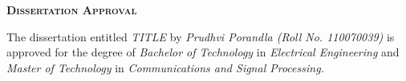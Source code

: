 
\newpage

\thispagestyle{empty}
\begin{center}
  \begin{Huge}
    \textsc{\textbf{Dissertation Approval}}
  \end{Huge}
\end{center}

\vspace{0.2in}

 The dissertation entitled \textit{TITLE} by \textit{Prudhvi Porandla (Roll No. 110070039)} is approved for the degree of \textit{Bachelor of Technology} in \textit{Electrical Engineering} and \textit{Master of Technology} in \textit{Communications and Signal Processing.}


\vspace{0.1in}

